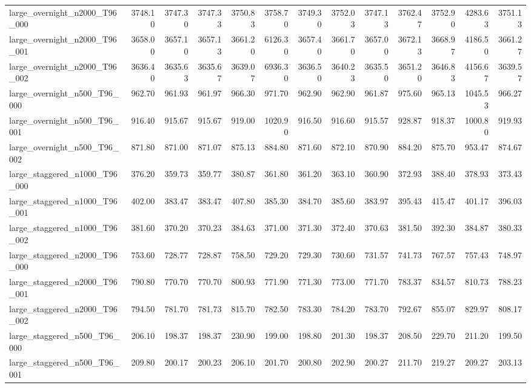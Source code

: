 \begin{table}[htbp]
\begin{tabular}{lrrrrrrrrrrrr}
large\_overnight\_n2000\_T96\_000 & 3748.10 & 3747.30 & 3747.33 & 3750.83 & 3758.70 & 3749.30 & 3752.03 & 3747.13 & 3762.47 & 3752.90 & 4283.63 & 3751.13 \\
large\_overnight\_n2000\_T96\_001 & 3658.00 & 3657.10 & 3657.13 & 3661.20 & 6126.30 & 3657.40 & 3661.70 & 3657.00 & 3672.13 & 3668.97 & 4186.50 & 3661.27 \\
large\_overnight\_n2000\_T96\_002 & 3636.40 & 3635.63 & 3635.67 & 3639.07 & 6936.30 & 3636.50 & 3640.23 & 3635.50 & 3651.20 & 3646.83 & 4156.67 & 3639.57 \\
large\_overnight\_n500\_T96\_000 & 962.70 & 961.93 & 961.97 & 966.30 & 971.70 & 962.90 & 962.90 & 961.87 & 975.60 & 965.13 & 1045.53 & 966.27 \\
large\_overnight\_n500\_T96\_001 & 916.40 & 915.67 & 915.67 & 919.00 & 1020.90 & 916.50 & 916.60 & 915.57 & 928.87 & 918.37 & 1000.80 & 919.93 \\
large\_overnight\_n500\_T96\_002 & 871.80 & 871.00 & 871.07 & 875.13 & 884.80 & 871.60 & 872.10 & 870.90 & 884.20 & 875.70 & 953.47 & 874.67 \\
large\_staggered\_n1000\_T96\_000 & 376.20 & 359.73 & 359.77 & 380.87 & 361.80 & 361.20 & 363.10 & 360.90 & 372.93 & 388.40 & 378.93 & 373.43 \\
large\_staggered\_n1000\_T96\_001 & 402.00 & 383.47 & 383.47 & 407.80 & 385.30 & 384.70 & 385.60 & 383.97 & 395.43 & 415.47 & 401.17 & 396.03 \\
large\_staggered\_n1000\_T96\_002 & 381.60 & 370.20 & 370.23 & 384.63 & 371.00 & 371.30 & 372.40 & 370.63 & 381.50 & 392.30 & 384.87 & 380.33 \\
large\_staggered\_n2000\_T96\_000 & 753.60 & 728.77 & 728.87 & 758.50 & 729.20 & 729.30 & 730.60 & 731.57 & 741.73 & 767.57 & 757.43 & 748.97 \\
large\_staggered\_n2000\_T96\_001 & 790.80 & 770.70 & 770.70 & 800.93 & 771.90 & 771.30 & 773.00 & 771.70 & 783.37 & 834.57 & 810.73 & 788.23 \\
large\_staggered\_n2000\_T96\_002 & 794.50 & 781.70 & 781.73 & 815.70 & 782.50 & 783.30 & 784.20 & 783.70 & 792.67 & 855.07 & 829.97 & 808.17 \\
large\_staggered\_n500\_T96\_000 & 206.10 & 198.37 & 198.37 & 230.90 & 199.00 & 198.80 & 201.30 & 198.37 & 208.50 & 229.70 & 211.20 & 199.50 \\
large\_staggered\_n500\_T96\_001 & 209.80 & 200.17 & 200.23 & 206.10 & 201.70 & 200.80 & 202.90 & 200.27 & 211.70 & 219.27 & 209.27 & 203.13 \\

\end{tabular}
\end{table}

